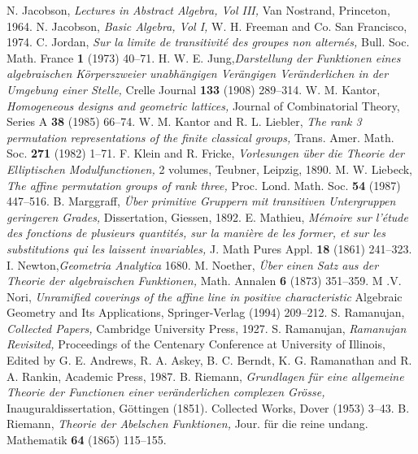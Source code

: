 \begin{thebibliography}{99}
 N. Jacobson, \textit{Lectures in Abstract Algebra, Vol III,} Van Nostrand, Princeton, 1964.
 N. Jacobson, \textit{Basic Algebra, Vol I,} W. H. Freeman and Co. San Francisco, 1974.
 C. Jordan, \textit{Sur la limite de transitivit\'e des groupes non altern\'es,} Bull. Soc. Math. France {\bf 1} (1973) 40--71.
 H. W. E. Jung,\textit{Darstellung der Funktionen eines algebraischen K\"orperszweier unabh\"angigen Ver\"angigen Ver\"anderlichen in der Umgebung einer Stelle,} Crelle Journal {\bf 133} (1908) 289--314.
 W. M. Kantor, \textit{Homogeneous designs and geometric lattices,} Journal of Combinatorial Theory, Series A {\bf 38} (1985) 66--74.
 W. M. Kantor and R. L. Liebler, \textit{The rank  3 permutation representations of the finite classical groups,} Trans. Amer. Math. Soc. {\bf 271} (1982) 1--71.
 F. Klein and R. Fricke, \textit{Vorlesungen \"uber die Theorie der Elliptischen Modulfunctionen,} 2 volumes, Teubner, Leipzig, 1890.
 M. W. Liebeck, \textit{The affine permutation groups of rank three,} Proc. Lond. Math. Soc. {\bf 54} (1987) 447--516.
 B. Marggraff, \textit{\"Uber primitive Gruppern mit transitiven Untergruppen geringeren Grades,} Dissertation, Giessen, 1892.
 E. Mathieu, \textit{M\'emoire sur l'\'etude des fonctions de plusieurs quantit\'es, sur la mani\`ere de les former, et sur les substitutions qui les laissent invariables,} J. Math Pures Appl. {\bf 18} (1861) 241--323.
 I. Newton,\pageoriginale \textit{Geometria Analytica} 1680.
 M. Noether, \textit{\"Uber einen Satz aus der Theorie der algebraischen Funktionen,} Math. Annalen {\bf 6} (1873) 351--359.
 M .V. Nori, \textit{Unramified coverings of the affine line in positive characteristic} Algebraic Geometry and Its Applications, Springer-Verlag (1994) 209--212.
 S. Ramanujan, \textit{Collected Papers,} Cambridge University Press, 1927.
 S. Ramanujan, \textit{Ramanujan Revisited,} Proceedings of the Centenary Conference at University of Illinois, Edited by G. E. Andrews, R. A. Askey, B. C. Berndt, K. G. Ramanathan and R. A. Rankin, Academic Press, 1987.
 B. Riemann, \textit{Grundlagen f\"ur eine allgemeine Theorie der Functionen einer ver\"anderlichen complexen Gr\"osse,} Inauguraldissertation, G\"ottingen (1851). Collected Works, Dover (1953) 3--43.
 B. Riemann, \textit{Theorie der Abelschen Funktionen,} Jour. f\"ur die reine undang. Mathematik {\bf 64} (1865) 115--155.

\end{thebibliography}
